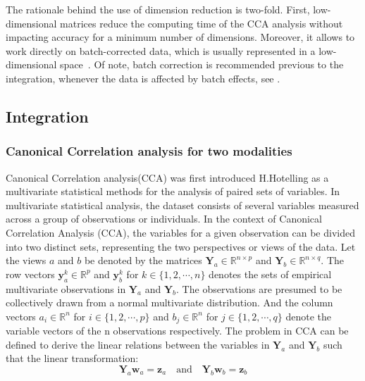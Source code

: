 The rationale behind the use of dimension reduction is two-fold. First, low-dimensional matrices reduce the computing time of the CCA analysis without impacting accuracy for a minimum number of dimensions. Moreover, it allows to work directly on batch-corrected data, which is usually represented in a low-dimensional space~\cite{hao2021seurat4, korsunsky2019harmony}. Of note, batch correction is recommended previous to the integration, whenever the data is affected by batch effects, see . 

\subsection{Integration}

\subsubsection{Canonical Correlation analysis for two modalities}
Canonical Correlation analysis(CCA) was first introduced H.Hotelling\citep{hotelling1935cca1,HOTELLING1936cca2} as a multivariate statistical methods for the analysis of paired sets of variables. In multivariate statistical analysis, the dataset consists of several variables measured across a group of observations or individuals. In the context of Canonical Correlation Analysis (CCA), the variables for a given observation can be divided into two distinct sets, representing the two perspectives or views of the data. Let the views $a$ and $b$ be denoted by the matrices $\mathbf{Y}_a\in\mathbb{R}^{n\times p}$ and $\mathbf{Y}_b\in \mathbb{R}^{n\times q}$. The row vectors $\mathbf{y}_a^k\in \mathbb{R}^{p}$ and $\mathbf{y}_b^k$ for $k\in\{1,2,\cdots, n\}$ denotes the sets of empirical multivariate observations in $\mathbf{Y}_a$ and $\mathbf{Y}_b$. The observations are presumed to be collectively drawn from a normal multivariate distribution. And the column vectors $a_i\in \mathbb{R}^n$ for $i\in \{1,2,\cdots, p\}$ and $b_j\in \mathbb{R}^n$ for ${j\in \{1,2,\cdots, q\}}$ denote the variable vectors of the n observations respectively. The problem in CCA can be defined to derive the linear relations between the variables in $\mathbf{Y}_a$ and $\mathbf{Y}_b$ such that the linear transformation:
\begin{equation}
\mathbf{Y}_a\mathbf{w}_a=\mathbf{z}_a\quad\text{and}\quad \mathbf{Y}_b\mathbf{w}_b=\mathbf{ z}_b
\end{equation}

